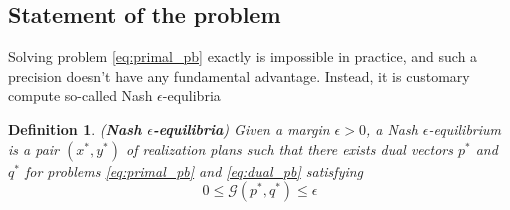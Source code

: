 \documentclass{article} %
\newtheorem{definition}[theorem]{Definition}
\begin{document}


\subsection{Statement of the problem}
Solving problem \eqref{eq:primal_pb} exactly is impossible in practice, and such a precision doesn't have any fundamental advantage. Instead, it is customary compute so-called Nash $\epsilon$-equlibria

\begin{definition}(\textbf{Nash $\epsilon$-equilibria})
Given a margin $\epsilon > 0$, a Nash $\epsilon$-equilibrium is a pair $(x^*, y^*)$ of realization plans such that there exists dual vectors $p^*$ and $q^*$ for problems \eqref{eq:primal_pb} and \eqref{eq:dual_pb} satisfying
\begin{equation}
  0 \le \mathcal{G}(p^*, q^*) \le \epsilon
\label{eq:approx_pb}
\end{equation}
\end{definition}
\end{document}
